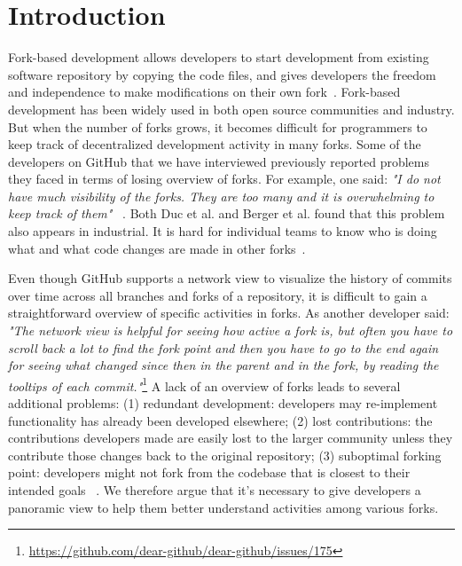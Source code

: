 \section{Introduction}
Fork-based development allows developers to start development from existing software repository by copying the code files, and gives developers the freedom and independence to make modifications on their own fork~\cite{dubinsky2013exploratory, bitzer2006impact, ernst2010code,vetter2007open}. Fork-based development has been widely used in both open source communities and industry. But when the number of forks grows, it becomes difficult for programmers to keep track of decentralized development activity in many forks. Some of the developers on GitHub that we have interviewed previously reported problems they faced in terms of losing overview of forks. For example, one said: \emph{"I do not have much visibility of the forks. They are too many and it is overwhelming to keep track of them"} ~\cite{ZSLXWK:ICSE18}. Both Duc et al. and Berger et al. found that this problem also appears in industrial. It is hard for individual teams to know who is doing what and what code changes are made in other forks~\cite{berger2014three,Duc:2014:FCM:2652524.2652546}.

Even though GitHub supports a network view to visualize the history of commits over time across all branches and forks of a repository, it is difficult to gain a straightforward overview of specific activities in forks. As another developer said: \emph{"The network view is helpful for seeing how active a fork is, but often you have to scroll back a lot to find the fork point and then you have to go to the end again for seeing what changed since then in the parent and in the fork, by reading the tooltips of each commit."}\footnote{\url{https://github.com/dear-github/dear-github/issues/175}}
 A lack of an overview of forks leads to several additional problems: (1) redundant development: developers may re-implement functionality has already been developed elsewhere; (2) lost contributions: the contributions developers made are easily lost to the larger community unless they contribute those changes back to the original repository; (3) suboptimal forking point: developers might not fork from the codebase that is closest to their intended goals ~\cite{ZSLXWK:ICSE18, dubinsky2013exploratory,stanciulescu2015forked}. We therefore argue that it's necessary to give developers a panoramic view to help them better understand activities among various forks.


